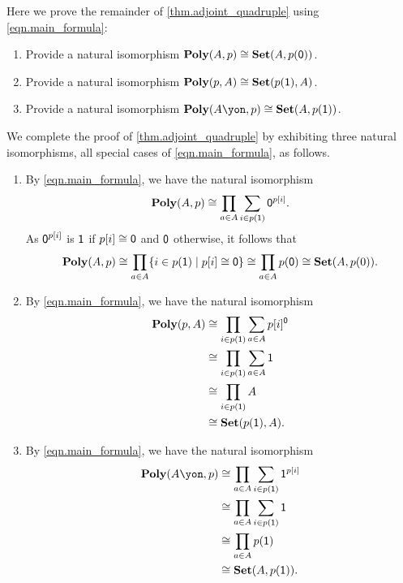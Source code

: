 \documentclass[Book-Poly]{subfiles}
\begin{document}
\begin{exercise}\label{exc.adjoint_quadruple}
Here we prove the remainder of \cref{thm.adjoint_quadruple} using \eqref{eqn.main_formula}:
\begin{enumerate}
	\item Provide a natural isomorphism $\mathbf{Poly}(A,p)\cong\mathbf{Set}(A,p(\textsf{0}))$.
	\item \label{exc.adjoint_quadruple.pos_const} Provide a natural isomorphism $\mathbf{Poly}(p,A)\cong\mathbf{Set}(p(\textsf{1}),A)$.
	\item \label{exc.adjoint_quadruple.linear_pos} Provide a natural isomorphism $\poly(A\yon,p)\iso\smset(A,p(\1))$.
\qedhere
\end{enumerate}
\begin{solution}
We complete the proof of \cref{thm.adjoint_quadruple} by exhibiting three natural isomorphisms, all special cases of \eqref{eqn.main_formula}, as follows.
\begin{enumerate}
    \item By \eqref{eqn.main_formula}, we have the natural isomorphism
    \[
        \poly(A, p) %
        \iso \prod_{a \in A} \sum_{i \in p(\1)} \0^{p[i]}.
    \]
    As $\textsf{0}^{p[i]}$ is $\textsf{1}$ if $p[i] \cong \textsf{0}$ and $\textsf{0}$ otherwise, it follows that
    \[
        \mathbf{Poly}(A, p) \cong \prod_{a \in A} \{ i \in p(\textsf{1}) \mid p[i] \cong \textsf{0} \} \cong \prod_{a \in A} p(\textsf{0}) \cong \mathbf{Set}(A, p(0)).
    \]
    \item By \eqref{eqn.main_formula}, we have the natural isomorphism
    \begin{align*}
        \poly(p, A) %
        &\iso \prod_{i \in p(\1)} \sum_{a \in A} p[i]^\0 \\
        &\iso \prod_{i \in p(\1)} \sum_{a \in A} \1 \\
        &\iso \prod_{i \in p(\1)} A \\
        &\iso \smset(p(\1), A).
    \end{align*}
    \item By \eqref{eqn.main_formula}, we have the natural isomorphism
    \begin{align*}
        \poly(A\yon, p) %
        &\iso \prod_{a \in A} \sum_{i \in p(\1)} \1^{p[i]} \\
        &\iso \prod_{a \in A} \sum_{i \in p(\1)} \1 \\
        &\iso \prod_{a \in A} p(\1) \\
        &\iso \smset(A, p(\1)).
    \end{align*}
\end{enumerate}
\end{solution}
\end{exercise}
\end{document}
